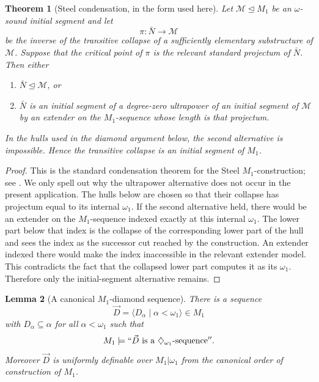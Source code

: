 \documentclass[a4paper,11pt]{article}
\newtheorem{theorem}{Theorem}[section]
\newtheorem{lemma}[theorem]{Lemma}
\begin{document}
\begin{theorem}[Steel condensation, in the form used here]\label{thm:steel-condensation-m1}
Let $\mathcal M\trianglelefteq M_1$ be an $\omega$-sound initial segment and let
\[
   \pi:\bar N\rightarrow\mathcal M
\]
be the inverse of the transitive collapse of a sufficiently elementary substructure of $\mathcal M$.  Suppose that the critical point of $\pi$ is the relevant standard projectum of $\bar N$.  Then either
\begin{enumerate}
   \item $\bar N\trianglelefteq\mathcal M$, or
   \item $\bar N$ is an initial segment of a degree-zero ultrapower of an initial segment of $\mathcal M$ by an extender on the $M_1$-sequence whose length is that projectum.
\end{enumerate}
In the hulls used in the diamond argument below, the second alternative is impossible.  Hence the transitive collapse is an initial segment of $M_1$.
\end{theorem}

\begin{proof}
This is the standard condensation theorem for the Steel $M_1$-construction; see \cite[Theorem~5.1]{Steel3}.  We only spell out why the ultrapower alternative does not occur in the present application.  The hulls below are chosen so that their collapse has projectum equal to its internal $\omega_1$.  If the second alternative held, there would be an extender on the $M_1$-sequence indexed exactly at this internal $\omega_1$.  The lower part below that index is the collapse of the corresponding lower part of the hull and sees the index as the successor cut reached by the construction.  An extender indexed there would make the index inaccessible in the relevant extender model.  This contradicts the fact that the collapsed lower part computes it as its $\omega_1$.  Therefore only the initial-segment alternative remains.
\end{proof}

\begin{lemma}[A canonical $M_1$-diamond sequence]\label{lem:m1-diamond}
There is a sequence
\[
   \vec D=\langle D_\alpha\mid \alpha<\omega_1\rangle\in M_1
\]
with $D_\alpha\subseteq\alpha$ for all $\alpha<\omega_1$ such that
\[
   M_1\models ``\vec D\text{ is a }\diamondsuit_{\omega_1}\text{-sequence}''.
\]
Moreover $\vec D$ is uniformly definable over $M_1|\omega_1$ from the canonical order of construction of $M_1$.
\end{lemma}
\end{document}
